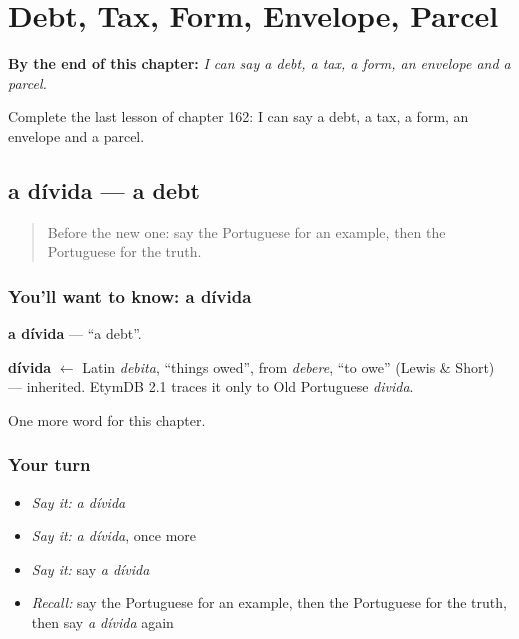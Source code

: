 
\chapter{Debt, Tax, Form, Envelope, Parcel}
\label{ch:pt-debt-tax-form-envelope-parcel}

\begin{chapteropening}
\textbf{By the end of this chapter:} \emph{I can say a debt, a tax, a form, an envelope and a parcel.}

Complete the last lesson of chapter 162: I can say a debt, a tax, a form, an envelope and a parcel.
\end{chapteropening}

\section[a dívida]{a dívida — a debt}

\label{lesson:PT-C162-divida}



\begin{quote}
Before the new one: say the Portuguese for an example, then the Portuguese for the truth.
\end{quote}

\subsection*{You'll want to know: a dívida}
\textbf{a dívida} — \textquotedblleft{}a debt\textquotedblright{}.

\begin{cousinweb}
\textbf{dívida} $\leftarrow$ Latin \emph{debita}, \textquotedblleft{}things owed\textquotedblright{}, from \emph{debere}, \textquotedblleft{}to owe\textquotedblright{} (Lewis \& Short) — inherited. EtymDB 2.1 traces it only to Old Portuguese \emph{divida}.
\end{cousinweb}

\begin{grammarlens}[title={What you've built}]
One more word for this chapter.
\end{grammarlens}

\subsection*{Your turn}
\begin{itemize}
\raggedright
  \item \emph{Say it:} \emph{a dívida}
  \item \emph{Say it:} \emph{a dívida}, once more
  \item \emph{Say it:} say \emph{a dívida}
  \item \emph{Recall:} say the Portuguese for an example, then the Portuguese for the truth, then say \emph{a dívida} again
\end{itemize}

